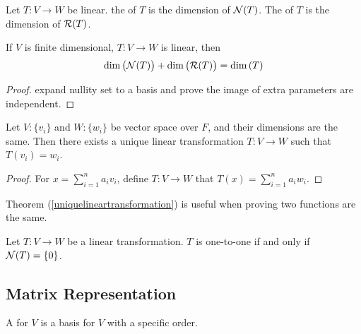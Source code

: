 \begin{definition}
	Let $T: V \rightarrow W$ be linear. the   of $T$ is the dimension of $\mathcal{N}(T)$. The  \label{rankdefinition} of $T$ is the dimension of $\mathcal{R}(T)$.
\end{definition}

\begin{theorem}
	If $V$ is finite dimensional, $T:V\rightarrow W$ is linear, then
	\begin{equation}
		\displaystyle \text{dim}\left( \mathcal{N}(T) \right) + \displaystyle \text{dim}\left( \mathcal{R}(T) \right) = \displaystyle \text{dim}\left( T \right)
	\end{equation}
\end{theorem}

\begin{proof}
	expand nullity set to a basis and prove the image of extra parameters are independent.
\end{proof}

\begin{theorem}\label{uniquelineartransformation}
	Let $V:\{v_i \}$ and $W:\{w_i \}$ be vector space over $F$, and their dimensions are the same. Then there exists a unique linear transformation $T:V \rightarrow W$ such that $T(v_i) = w_i$.
\end{theorem}

\begin{proof}
    For $\displaystyle x = \sum_{i=1}^{n} a_i v_i$, define $T:V \rightarrow W$ that $\displaystyle T(x) = \sum_{i=1}^n a_i w_i$.
\end{proof}

Theorem (\ref{uniquelineartransformation}) is useful when proving two functions are the same.


\begin{theorem}
    Let $T: V \rightarrow W$ be a linear transformation. $T$ is one-to-one if and only if $\mathcal{N}(T) = \{ 0 \}$.    
\end{theorem}







\subsection{Matrix Representation}

\begin{definition}
	A   for $V$ is a basis for $V$ with a specific order.
\end{definition}

